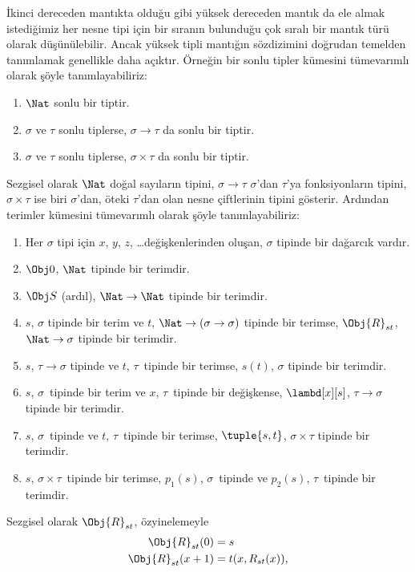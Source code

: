 İkinci dereceden mantıkta olduğu gibi yüksek dereceden mantık da ele almak
istediğimiz her nesne tipi için bir sıranın bulunduğu çok sıralı bir mantık
türü olarak düşünülebilir. Ancak yüksek tipli mantığın sözdizimini doğrudan
temelden tanımlamak genellikle daha açıktır. Örneğin bir sonlu tipler kümesini
tümevarımlı olarak şöyle tanımlayabiliriz:
\begin{enumerate}
\item $\Nat$ sonlu bir tiptir.
\item $\sigma$ ve $\tau$ sonlu tiplerse, $\sigma \to \tau$ da sonlu bir
  tiptir.
\item $\sigma$ ve $\tau$ sonlu tiplerse, $\sigma \times \tau$ da sonlu bir
  tiptir.
\end{enumerate}
Sezgisel olarak $\Nat$ doğal sayıların tipini, $\sigma \to \tau$ $\sigma$'dan
$\tau$'ya fonksiyonların tipini, $\sigma \times \tau$ ise biri $\sigma$'dan,
öteki $\tau$'dan olan nesne çiftlerinin tipini gösterir. Ardından terimler
kümesini tümevarımlı olarak şöyle tanımlayabiliriz:
\begin{enumerate}
\item Her $\sigma$ tipi için $x$, $y$, $z$, \dots değişkenlerinden oluşan,
  $\sigma$ tipinde bir dağarcık vardır.
\item $\Obj 0$, $\Nat$ tipinde bir terimdir.
\item $\Obj S$ (ardıl), $\Nat \to \Nat$ tipinde bir terimdir.
\item $s$, $\sigma$ tipinde bir terim ve $t$, $\Nat \to (\sigma \to
  \sigma)$ tipinde bir terimse, $\Obj{R}_{st}$, $\Nat \to \sigma$ tipinde
  bir terimdir.
\item $s$, $\tau \to \sigma$ tipinde ve $t$, $\tau$~tipinde bir terimse,
  $s(t)$, $\sigma$ tipinde bir terimdir.
\item $s$, $\sigma$~tipinde bir terim ve $x$, $\tau$~tipinde bir değişkense,
  $\lambd[x][s]$, $\tau \to \sigma$ tipinde bir terimdir.
\item $s$, $\sigma$~tipinde ve $t$, $\tau$~tipinde bir terimse,
  $\tuple{s, t}$, $\sigma \times \tau$ tipinde bir terimdir.
\item $s$, $\sigma \times \tau$~tipinde bir terimse, $p_1(s)$,
  $\sigma$~tipinde ve $p_2(s)$, $\tau$~tipinde bir terimdir.
\end{enumerate}
Sezgisel olarak $\Obj{R}_{st}$, özyinelemeyle
\begin{align*}
\Obj{R}_{st}(0) & = s \\
\Obj{R}_{st}(x+1) & = t(x, R_{st}(x)),
\end{align*}
